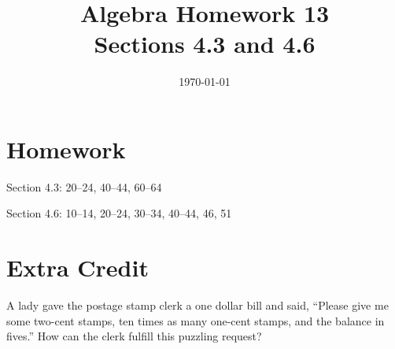 \documentclass[letterpaper]{exam}
\title{Algebra Homework 13 \\ Sections 4.3 and 4.6}
\author{}
\date{\today}
\begin{document}
  \maketitle

  \section{Homework}

  \begin{itemize*}
    \item Section 4.3: 20--24, 40--44, 60--64
    \item Section 4.6: 10--14, 20--24, 30--34, 40--44, 46, 51
  \end{itemize*}

  \section{Extra Credit}

  A lady gave the postage stamp clerk a one dollar bill and said, ``Please give
  me some two-cent stamps, ten times as many one-cent stamps, and the balance
  in fives.''  How can the clerk fulfill this puzzling request?
\end{document}

